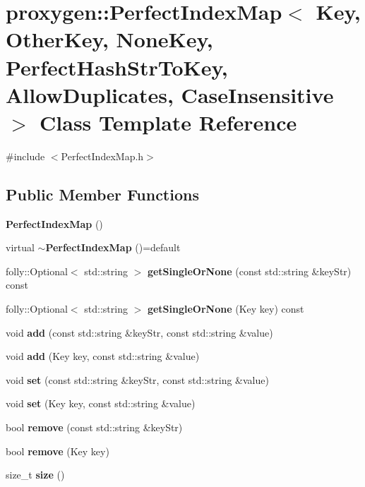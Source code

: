 \section{proxygen\+:\+:Perfect\+Index\+Map$<$ Key, Other\+Key, None\+Key, Perfect\+Hash\+Str\+To\+Key, Allow\+Duplicates, Case\+Insensitive $>$ Class Template Reference}
\label{classproxygen_1_1PerfectIndexMap}


{\ttfamily \#include $<$Perfect\+Index\+Map.\+h$>$}

\subsection*{Public Member Functions}
\begin{DoxyCompactItemize}
\item 
{\bf Perfect\+Index\+Map} ()
\item 
virtual {\bf $\sim$\+Perfect\+Index\+Map} ()=default
\item 
folly\+::\+Optional$<$ std\+::string $>$ {\bf get\+Single\+Or\+None} (const std\+::string \&key\+Str) const 
\item 
folly\+::\+Optional$<$ std\+::string $>$ {\bf get\+Single\+Or\+None} (Key key) const 
\item 
void {\bf add} (const std\+::string \&key\+Str, const std\+::string \&value)
\item 
void {\bf add} (Key key, const std\+::string \&value)
\item 
void {\bf set} (const std\+::string \&key\+Str, const std\+::string \&value)
\item 
void {\bf set} (Key key, const std\+::string \&value)
\item 
bool {\bf remove} (const std\+::string \&key\+Str)
\item 
bool {\bf remove} (Key key)
\item 
size\+\_\+t {\bf size} ()
\end{DoxyCompactItemize}
